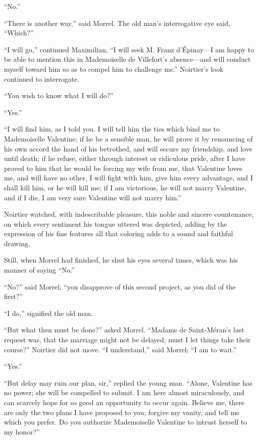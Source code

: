 “No.”

“There is another way,” said Morrel. The old man’s interrogative eye
said, “Which?”

“I will go,” continued Maximilian, “I will seek M. Franz d’Épinay—I am
happy to be able to mention this in Mademoiselle de Villefort’s
absence—and will conduct myself toward him so as to compel him to
challenge me.” Noirtier’s look continued to interrogate.

“You wish to know what I will do?”

“Yes.”

“I will find him, as I told you. I will tell him the ties which bind me
to Mademoiselle Valentine; if he be a sensible man, he will prove it by
renouncing of his own accord the hand of his betrothed, and will secure
my friendship, and love until death; if he refuse, either through
interest or ridiculous pride, after I have proved to him that he would
be forcing my wife from me, that Valentine loves me, and will have no
other, I will fight with him, give him every advantage, and I shall
kill him, or he will kill me; if I am victorious, he will not marry
Valentine, and if I die, I am very sure Valentine will not marry him.”

Noirtier watched, with indescribable pleasure, this noble and sincere
countenance, on which every sentiment his tongue uttered was depicted,
adding by the expression of his fine features all that coloring adds to
a sound and faithful drawing.

Still, when Morrel had finished, he shut his eyes several times, which
was his manner of saying “No.”

“No?” said Morrel; “you disapprove of this second project, as you did
of the first?”

“I do,” signified the old man.

“But what then must be done?” asked Morrel. “Madame de Saint-Méran’s
last request was, that the marriage might not be delayed; must I let
things take their course?” Noirtier did not move. “I understand,” said
Morrel; “I am to wait.”

“Yes.”

“But delay may ruin our plan, sir,” replied the young man. “Alone,
Valentine has no power; she will be compelled to submit. I am here
almost miraculously, and can scarcely hope for so good an opportunity
to occur again. Believe me, there are only the two plans I have
proposed to you; forgive my vanity, and tell me which you prefer. Do
you authorize Mademoiselle Valentine to intrust herself to my honor?”

